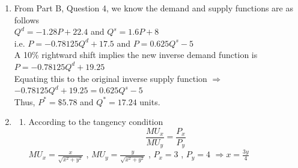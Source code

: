 \documentclass{article}
\begin{document}
\begin{enumerate}
\begin{center}
        \end{center}
        \begin{itemize}
            \item Consumer Surplus = \(\frac{1}{2}\) $\times$ (20-16) $\times$ (4-0) = 8 $\Rightarrow \Delta CS=-4.5$ \\
            \item Producer Surplus = \(\frac{1}{2}\) $\times$ [(12-0)+(12-8)] $\times$ (4-0) = 32 $\Rightarrow \Delta PS=-18$ \\
            \item Deadweight Loss = \(\frac{1}{2}\) $\times$ (16-8) $\times$ (6.67-4) = 10.67 $\Rightarrow \Delta DWL= 6.5$
        \end{itemize} 
    \item 
        From Part B, Question 4, we know the demand and supply functions are as follows \\ $Q^d = -1.28P+22.4$ and $Q^s = 1.6P+8$ \\
        i.e. $P = -0.78125Q^d + 17.5$ and $P = 0.625Q^s - 5$ \\
        A 10\% rightward shift implies the new inverse demand function is
        $P=-0.78125Q^d + 19.25$ \\
        Equating this to the original inverse supply function $\Rightarrow$
        $-0.78125Q^d + 19.25 = 0.625Q^s - 5$ \\
        Thus, $P^* = \$5.78$ and $Q^* = 17.24$ units.
    \item
        \begin{enumerate}[label=(\roman*)]
            \item
                According to the tangency condition
                \[
                \frac{MU_x}{MU_y} = \frac{P_x}{P_y}
                \]
                $MU_x=\frac{x}{\sqrt{x^2+y^2}}$ , $MU_y=\frac{y}{\sqrt{x^2+y^2}}$ , $P_x=3$ , $P_y=4$ $\Rightarrow x=\frac{3y}{4}$\\

\end{enumerate}
\end{enumerate}
\end{document}
